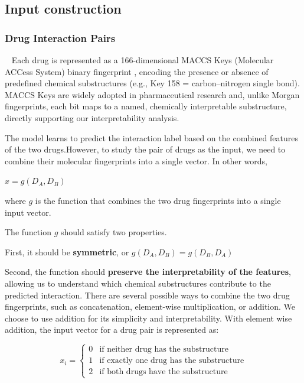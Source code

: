 \documentclass[letterpaper]{article} %
\begin{document}
\subsection{Input construction}

\subsubsection{Drug Interaction Pairs}
\
\newline
Each drug is represented as a 166-dimensional MACCS Keys (Molecular ACCess System) binary fingerprint \cite{rdkit}, encoding the presence or absence of predefined chemical substructures (e.g., Key 158 = carbon–nitrogen single bond). MACCS Keys are widely adopted in pharmaceutical research \cite{xie2020improvement,durant2002reoptimization} and, unlike Morgan fingerprints, each bit maps to a named, chemically interpretable substructure, directly supporting our interpretability analysis. 

The model learns to predict the interaction label based on the combined features of the two drugs.However, to study the pair of drugs as the input, we need to combine their molecular fingerprints into a single vector. In other words, 
\begin{center}$x = g(D_A, D_B)$
\end{center}
where $g$ is the function that combines the two drug fingerprints into a single input vector.

The function $g$ should satisfy two properties.

First, it should be \textbf{symmetric}, or $g(D_A, D_B) = g(D_B, D_A)$

Second, the function should \textbf{preserve the interpretability of the features}, allowing us to understand which chemical substructures contribute to the predicted interaction.
There are several possible ways to combine the two drug fingerprints, such as concatenation, element-wise multiplication, or addition. We choose to use addition for its simplicity and interpretability. With element wise addition, the input vector for a drug pair is represented as:

\begin{equation}
    x_i = \begin{cases}
        0 & \text{if neither drug has the substructure} \\
        1 & \text{if exactly one drug has the substructure} \\
        2 & \text{if both drugs have the substructure} 
        \end{cases}
\end{equation}
\end{document}
